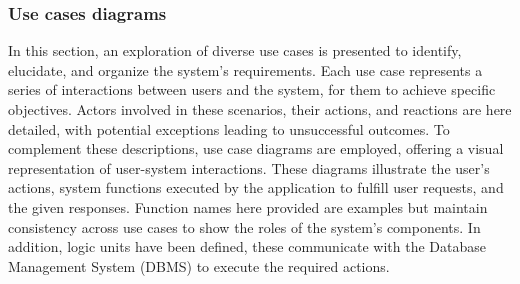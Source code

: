 \subsubsection{Use cases diagrams}
In this section, an exploration of diverse use cases is presented to identify, elucidate, and organize the system's requirements. Each use case represents a series of interactions between users and the system, for them to achieve specific objectives. Actors involved in these scenarios, their actions, and reactions are here detailed, with potential exceptions leading to unsuccessful outcomes. To complement these descriptions, use case diagrams are employed, offering a visual representation of user-system interactions. These diagrams illustrate the user's actions, system functions executed by the application to fulfill user requests, and the given responses. Function names here provided are examples but maintain consistency across use cases to show the roles of the system’s components. In addition, logic units have been defined, these communicate with the Database Management System (DBMS) to execute the required actions.

